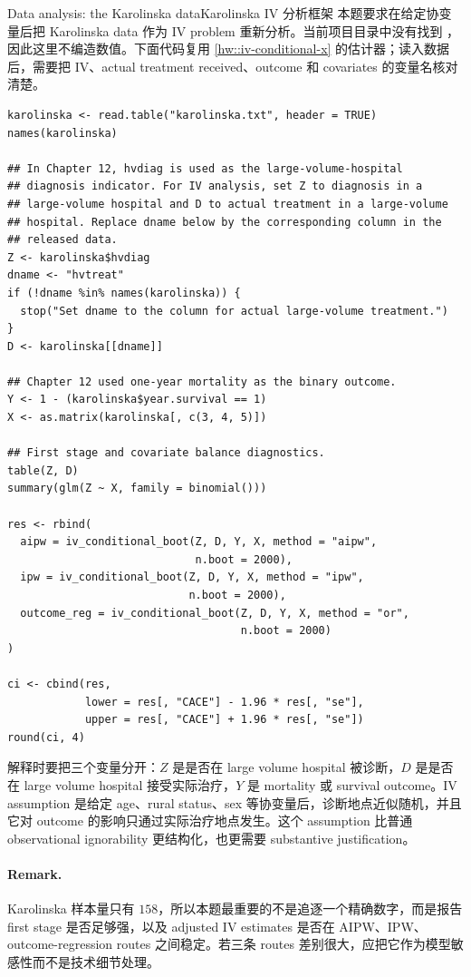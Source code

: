 \begin{exercisesolution}{Data analysis: the Karolinska data}{Karolinska IV 分析框架}
本题要求在给定协变量后把 Karolinska data 作为 IV problem 重新分析。当前项目目录中没有找到 ，因此这里不编造数值。下面代码复用 \cref{hw::iv-conditional-x} 的估计器；读入数据后，需要把 IV、actual treatment received、outcome 和 covariates 的变量名核对清楚。

\begin{lstlisting}
karolinska <- read.table("karolinska.txt", header = TRUE)
names(karolinska)

## In Chapter 12, hvdiag is used as the large-volume-hospital
## diagnosis indicator. For IV analysis, set Z to diagnosis in a
## large-volume hospital and D to actual treatment in a large-volume
## hospital. Replace dname below by the corresponding column in the
## released data.
Z <- karolinska$hvdiag
dname <- "hvtreat"
if (!dname %in% names(karolinska)) {
  stop("Set dname to the column for actual large-volume treatment.")
}
D <- karolinska[[dname]]

## Chapter 12 used one-year mortality as the binary outcome.
Y <- 1 - (karolinska$year.survival == 1)
X <- as.matrix(karolinska[, c(3, 4, 5)])

## First stage and covariate balance diagnostics.
table(Z, D)
summary(glm(Z ~ X, family = binomial()))

res <- rbind(
  aipw = iv_conditional_boot(Z, D, Y, X, method = "aipw",
                             n.boot = 2000),
  ipw = iv_conditional_boot(Z, D, Y, X, method = "ipw",
                            n.boot = 2000),
  outcome_reg = iv_conditional_boot(Z, D, Y, X, method = "or",
                                    n.boot = 2000)
)

ci <- cbind(res,
            lower = res[, "CACE"] - 1.96 * res[, "se"],
            upper = res[, "CACE"] + 1.96 * res[, "se"])
round(ci, 4)
\end{lstlisting}

解释时要把三个变量分开：$Z$ 是是否在 large volume hospital 被诊断，$D$ 是是否在 large volume hospital 接受实际治疗，$Y$ 是 mortality 或 survival outcome。IV assumption 是给定 age、rural status、sex 等协变量后，诊断地点近似随机，并且它对 outcome 的影响只通过实际治疗地点发生。这个 assumption 比普通 observational ignorability 更结构化，也更需要 substantive justification。

\paragraph{Remark.}
Karolinska 样本量只有 $158$，所以本题最重要的不是追逐一个精确数字，而是报告 first stage 是否足够强，以及 adjusted IV estimates 是否在 AIPW、IPW、outcome-regression routes 之间稳定。若三条 routes 差别很大，应把它作为模型敏感性而不是技术细节处理。
\end{exercisesolution}

